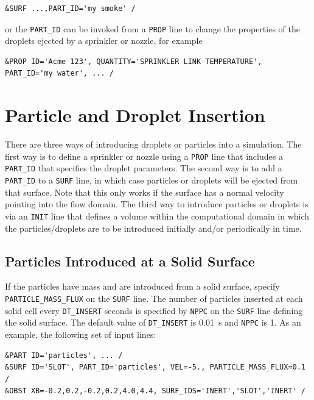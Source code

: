\documentclass[11pt]{book}
\newcommand{\ct}{\tt\small}
\begin{document}
\footnotesize
\begin{verbatim}
&SURF ...,PART_ID='my smoke' /
\end{verbatim}
\normalsize
or the {\ct PART\_ID} can be invoked from a {\ct PROP} line to change
the properties of the droplets ejected by a sprinkler or nozzle, for example

\footnotesize
\begin{verbatim}
&PROP ID='Acme 123', QUANTITY='SPRINKLER LINK TEMPERATURE', PART_ID='my water', ... /
\end{verbatim}
\normalsize



\clearpage

\section{Particle and Droplet Insertion}
\label{info:controlling_droplets}

There are three ways of introducing droplets or particles into a simulation. The first way is to define a sprinkler or
nozzle using a {\ct PROP} line that includes a {\ct PART\_ID} that specifies the droplet parameters. The second way is to
add a {\ct PART\_ID} to a {\ct SURF} line, in which case particles or droplets will be ejected from that surface. Note that
this only works if the surface has a normal velocity pointing into the flow domain. The third way to introduce particles or
droplets is via an {\ct INIT} line that defines a volume within the computational domain in which the particles/droplets are
to be introduced initially and/or periodically in time.


\subsection{Particles Introduced at a Solid Surface}
\label{info:particle_flux}

If the particles have mass and are introduced from a solid surface, specify {\ct PARTICLE\_MASS\_FLUX} on the {\ct SURF} line.
The number of particles inserted at each solid cell every
{\ct DT\_INSERT} seconds is specified by {\ct NPPC} on the {\ct SURF} line defining the solid surface. The default
value of {\ct DT\_INSERT} is 0.01~s and {\ct NPPC} is 1. As an example, the following set of input lines:

\footnotesize
\begin{verbatim}
&PART ID='particles', ... /
&SURF ID='SLOT', PART_ID='particles', VEL=-5., PARTICLE_MASS_FLUX=0.1 /
&OBST XB=-0.2,0.2,-0.2,0.2,4.0,4.4, SURF_IDS='INERT','SLOT','INERT' /
\end{verbatim} \normalsize
\end{document}
